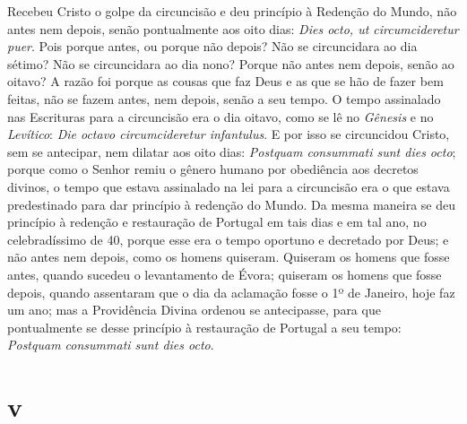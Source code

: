Recebeu Cristo o golpe da circuncisão e deu princípio à Redenção do
Mundo, não antes nem depois, senão pontualmente aos oito dias:
\emph{Dies octo, ut circumcideretur puer}. Pois porque antes, ou porque
não depois? Não se circuncidara ao dia sétimo? Não se circuncidara ao
dia nono? Porque não antes nem depois, senão ao oitavo? A razão foi
porque as cousas que faz Deus e as que se hão de fazer bem feitas, não
se fazem antes, nem depois, senão a seu tempo. O tempo assinalado nas
Escrituras para a circuncisão era o dia oitavo, como se lê no
\emph{Gênesis} e no \emph{Levítico}: \emph{Die octavo circumcideretur
infantulus}. E por isso se circuncidou Cristo, sem se antecipar, nem
dilatar aos oito dias: \emph{Postquam consummati sunt dies octo}; porque
como o Senhor remiu o gênero humano por obediência aos decretos divinos,
o tempo que estava assinalado na lei para a circuncisão era o que estava
predestinado para dar princípio à redenção do Mundo. Da mesma maneira se
deu princípio à redenção e restauração de Portugal em tais dias e em tal
ano, no celebradíssimo de 40, porque esse era o tempo oportuno e
decretado por Deus; e não antes nem depois, como os homens quiseram.
Quiseram os homens que fosse antes, quando sucedeu o levantamento de
Évora; quiseram os homens que fosse depois, quando assentaram que o dia
da aclamação fosse o 1º de Janeiro, hoje faz um ano; mas a Providência
Divina ordenou se antecipasse, para que pontualmente se desse princípio
à restauração de Portugal a seu tempo: \emph{Postquam consummati sunt
dies octo}.

\section*{v}

